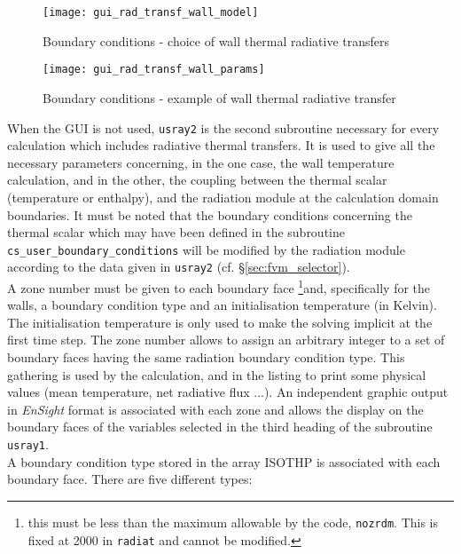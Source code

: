 {{\begin{figure}[ht]
\begin{center}
\texttt{[image: gui\_rad\_transf\_wall\_model]}
\caption{Boundary conditions - choice of wall thermal radiative transfers}
\label{fig:6_ray}
\end{center}
\end{figure}

\begin{figure}[ht]
\begin{center}
\texttt{[image: gui\_rad\_transf\_wall\_params]}
\caption{Boundary conditions - example of wall thermal radiative transfer}
\label{fig:7_ray}
\end{center}
\end{figure}

When the GUI is not used, \texttt{usray2} is the second subroutine necessary for every calculation which includes radiative thermal transfers. It is used to give all the
necessary parameters concerning, in the one case, the wall temperature
calculation, and in the other, the coupling between the thermal
scalar (temperature or enthalpy), and the radiation module at the
calculation domain boundaries. It must be noted that the boundary conditions
concerning the thermal scalar which may have been defined in the
subroutine \texttt{cs\_user\_boundary\_conditions} will be modified by the radiation module
according to the data given in \texttt{usray2} (cf. \S\ref{sec:fvm_selector}).\\
A zone number must be given to each boundary face \footnote{this must be less
 than the maximum allowable by the code, \texttt{nozrdm}. This is fixed at 2000
 in \texttt{radiat} and cannot be modified.}and, specifically for
the walls, a boundary condition type and an initialisation temperature
(in Kelvin). The initialisation temperature is only used to make the
solving implicit at the first time step. The zone number allows to assign
an arbitrary integer to a set of boundary faces having the same
radiation boundary condition type. This gathering is used by the
calculation, and in the listing to print some physical values (mean
temperature, net radiative flux ...). An independent graphic output in
{\em EnSight} format is associated with each zone and allows the display on
the boundary faces of the variables selected in the third heading of the
subroutine \texttt{usray1}.\\
A boundary condition type stored in the array ISOTHP is associated with
each boundary face. There are five different types:

}}
